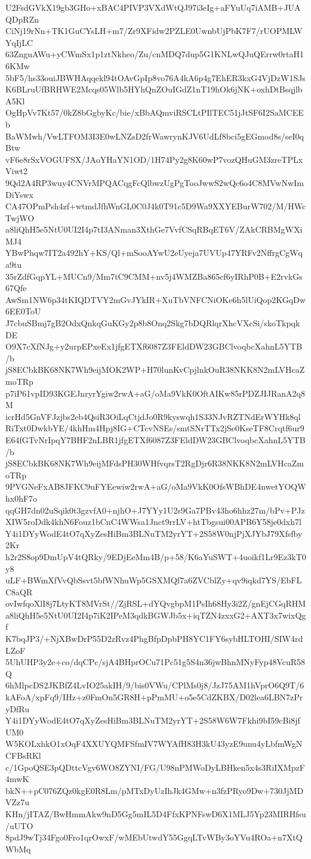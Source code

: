 U2FsdGVkX19gb3GHo+xBAC4PIVP3VXdWtQJ97i3eIg+aFYuUq7iAMB+JUAQDpRZn
CiNj19rNn+TK1GuCYsLH+m7/Zr9XFidw2PZLE0UwnbUjPbK7F7/rUOPMLWYqIjLC
63ZnguAWu+yCWmSx1p1ztNkheo/Zu/cnMDQ7dup5G1KNLwQJuQErrw0rtaH16KMw
5bF5/hs33ouiJBWHAqqekl94tOAvGpIp8vo76A4kA6p4g7EhER3kxG4VjDzW1SJs
K6BLruUfBRHWE2Mcqs05Wlb5HYhQnZOuIGdZ1nT19hOk6jNK+oxhDtBsqjlbA5Kl
OgHpVv7Kt57/0kZ8bGgbyKc/bie/xBbAQmviRSCLtPIlTEC51jJtSF6I2SaMCEEb
BaWMwh/VwLTFOM3I3E0wLNZsD2frWawrynKJV6UdLf8bci5gEGmod8s/seI0qBtw
vF6e8rSxVOGUFSX/JAoYHaYN1OD/1H74Py2g8K60wP7vozQHuGM3zreTPLxViwt2
9Qd2A4RP3wuy4CNVrMPQACqgFcQlbwzUgPgTooJwwS2wQc6o4C8MVwNwImDiYswx
CA47OPmPsh4zf+wtmdJfhWnGL0C0J4k0T91c5D9Wa9XXYEBurW702/M/HWcTwjWO
a8liQhH5e5NtU0UI2I4p7tI3ANman3XthGe7VvfCSqRBqET6V/ZAkCRBMgWXiMJ4
YBwPhqw7IT2a492hY+KS/Ql+mSooAYwU2eUyeja7UVUp47YRFv2NffrgCgWqa9tu
35rZdfGqpYL+MUCn9/Mm7tC9CMM+nv5j4WMZBa865cf6yIRhP0B+E2rvkGs67Qfe
AwSm1NW6p34tKIQDTVY2mGvJYkIR+XuTbVNFCNiOKe6h5lUiQop2KGqDw6EE0ToU
J7cbuSBmj7gB2OdxQnkqGuKGy2p8b8Onq2Skg7bDQRlqrXhcVXcSi/skoTkpqkDE
O9X7cXfNJg+y2urpEPxeEx1jfgETXf6087Z3FEldDW23GBClvoqbcXahnL5YTB/b
jS8ECbkBK68NK7Wh9eijMOK2WP+H70lunKvCpjlnkOuR38NKK8N2mLVHcaZmoTRp
p7iP61vpID93KGEJnryrYgiw2rwA+aG/oMa9VkK0OftAIKw85rPDZJIJRanA2q8M
icrHd5GnVFJzjbs2eb4QsiR3OiLqCtjdJo0R9kyswqh1S33NJvRZTNdErWYHk8ql
RiTxt0DwkbYE/4khHm4Hpj8IG+CTcvNSEs/smtSNrTTx2jSe0KseTF8Crqtf6ur9
E64fGTvNrIpqY7BHF2nLBR1jfgETXf6087Z3FEldDW23GBClvoqbcXahnL5YTB/b
jS8ECbkBK68NK7Wh9eijMFdsPH30WHfvqrsT2RgDjr6R38NKK8N2mLVHcaZmoTRp
9PVGNeFxAB8JFKC9uFYEewiw2rwA+aG/oMa9VkK0OfsWBhDE4nwetYOQWhx0hF7o
qqGH7dn02uSqik0t3gzvfA0+njhO+J7YYy1U2s9Ga7PBv43ho6hhz27m/bPv+PJz
XIW5roDdk4khN6Fouz1bCnC4WWsa1Jnct9rrLV+htTbgsui00APB6Y58je0dxh7l
Y4i1DYyWodE4tO7qXyZesHiBm3BLNuTM2yrYT+2S58W0njPjXJYbJ79Xfsfby2Kr
h2r2S8op9DmUpV4tQRky/9EDjEeMm4B/p+58/K6aYuSWT+4uoikf1Lr9Ez3kT0y8
uLF+BWmXfVvQbSsvt5bfWNhuWp5GSXMQf7a6ZVCblZy+qv9iqkd7YS/EbFLC8aQR
ovIwfqoXlI8j7LtyKT8MVrSt//ZjRSL+dYQvgbpM1PsIh68Hy3i2Z/gnEjCGqRHM
a8liQhH5e5NtU0UI2I4p7iK2IPeM3qdkBGWJb5x+iqTZN4zxxG2+AXT3x7wixQgf
K7bqJP3/+NjXBwDrP55D2zRvz4PhgBfpDpbPH8YC1FY6sybHLTOHI/SIW4rdLZoF
5UhUHP3y2e+co/dqCPc/sjA4BHprOCu71Pc51g5S4n36jwBhnMNyFyp48VcuR58Q
6hMlpcDS2JKBfZ4LvIO25akIH/9/bis0VWu/CPlMs0j8/JzJ75AM1hVprO6Q9T/6
kAFoA/xpFq9/IHz+z0FmOn5GR8H+pPmMU+o5e5CdZKBX/D02lea6LBN7zPryDfRu
Y4i1DYyWodE4tO7qXyZesHiBm3BLNuTM2yrYT+2S58W6W7Fkhi9bI59cBi8jfUM0
W5KOLxhkO1xOqF4XXUYQMFSfmIV7WYAfH83H3kU43yzE9unu4yLbfmWgNCFBsRKl
c/1GpoQSE3pQDttcVgv6WO8ZYNI/FG/U98nPMWoDyLBHken5x4s3RiIXMpzF4mwK
bkN++pC076ZQz0kgE0R8Lm/pMTxDyUzIhJk4GMw+n3fzPRyo9Dw+730JjMDVZz7u
KHn/jITAZ/BwHmmAkw9nD5Gg5mIL5D4FfxKPNFswD6X1MLJ5Yp23MIRHfsu/uUTO
8pdJ9wTj34Fgo0Fro1qrOwxF/wMEbUtwdY55GgqLTvWBy3oYVu4ROa+n7XtQWbMq
